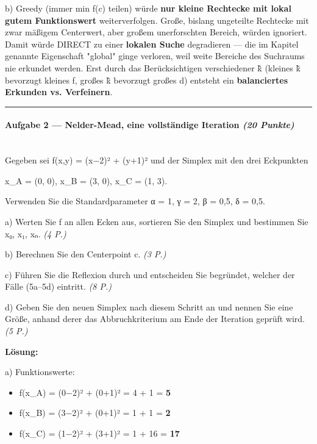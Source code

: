 \documentclass[11pt, a4paper]{article}
\begin{document}
b) Greedy (immer min f(c⃗) teilen) würde \textbf{nur kleine Rechtecke mit lokal gutem Funktionswert} weiterverfolgen. Große, bislang ungeteilte Rechtecke mit zwar mäßigem Centerwert, aber großem unerforschten Bereich, würden ignoriert. Damit würde DIRECT zu einer \textbf{lokalen Suche} degradieren — die im Kapitel genannte Eigenschaft "global" ginge verloren, weil weite Bereiche des Suchraums nie erkundet werden. Erst durch das Berücksichtigen verschiedener k̃ (kleines k̃ bevorzugt kleines f, großes k̃ bevorzugt großes d) entsteht ein \textbf{balanciertes Erkunden vs. Verfeinern}.



\noindent\textcolor{rulegray}{\rule{\linewidth}{0.4pt}}


\paragraph{Aufgabe 2 — Nelder-Mead, eine vollständige Iteration \textit{(20 Punkte)}}\mbox{}\\[2pt]

Gegeben sei f(x,y) = (x−2)² + (y+1)² und der Simplex mit den drei Eckpunkten


x⃗\_A = (0, 0),  x⃗\_B = (3, 0),  x⃗\_C = (1, 3).


Verwenden Sie die Standardparameter α = 1, γ = 2, β = 0,5, δ = 0,5.


a) Werten Sie f an allen Ecken aus, sortieren Sie den Simplex und bestimmen Sie x⃗₀, x⃗₁, x⃗ₙ. \textit{(4 P.)}


b) Berechnen Sie den Centerpoint c⃗. \textit{(3 P.)}


c) Führen Sie die Reflexion durch und entscheiden Sie begründet, welcher der Fälle (5a–5d) eintritt. \textit{(8 P.)}


d) Geben Sie den neuen Simplex nach diesem Schritt an und nennen Sie eine Größe, anhand derer das Abbruchkriterium am Ende der Iteration geprüft wird. \textit{(5 P.)}


\textbf{Lösung:}


a) Funktionswerte:

\begin{itemize}
  \item f(x⃗\_A) = (0−2)² + (0+1)² = 4 + 1 = \textbf{5}
  \item f(x⃗\_B) = (3−2)² + (0+1)² = 1 + 1 = \textbf{2}
  \item f(x⃗\_C) = (1−2)² + (3+1)² = 1 + 16 = \textbf{17}
\end{itemize}
\end{document}
